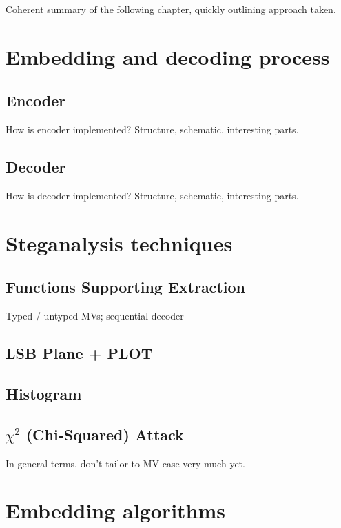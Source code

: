 \documentclass[12pt,british,twoside,notitlepage,usenames,dvipsnames,hypens,final]{report}
\numberwithin{equation}{section}
\numberwithin{figure}{section}
\begin{document}

Coherent summary of the following chapter, quickly outlining approach taken.

\section{Embedding and decoding process}

\subsection{Encoder}

How is encoder implemented? Structure, schematic, interesting parts. 

\subsection{Decoder}

How is decoder implemented? Structure, schematic, interesting parts. 

\section{Steganalysis techniques}

\subsection{Functions Supporting Extraction}

Typed / untyped MVs; sequential decoder

\subsection{LSB Plane + PLOT}

\subsection{Histogram}

\subsection{$\chi^2$ (Chi-Squared) Attack}

In general terms, don't tailor to MV case very much yet.

\section{Embedding algorithms}
\end{document}
